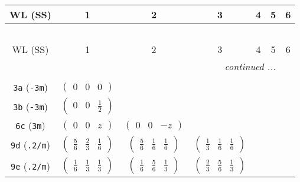 \documentclass[fleqn,9pt,landscape]{jsarticle}
\begin{document}
\begin{center}
\renewcommand{\arraystretch}{1.2}
\begin{longtable}{ccccccc}
 \hline \hline
WL (SS) & 1 & 2 & 3 & 4 & 5 & 6 \\ \hline \endfirsthead

\multicolumn{6}{l}{\tablename\ \thetable{}} \\
 \hline \hline
WL (SS) & 1 & 2 & 3 & 4 & 5 & 6 \\ \hline \endhead

 \hline \hline
\multicolumn{6}{r}{\footnotesize\it continued ...} \\ \endfoot

 \hline \hline
\multicolumn{6}{r}{} \\ \endlastfoot

{\tt 3a} ({\tt -3m}) & $ \begin{pmatrix} 0 & 0 & 0 \end{pmatrix} $ & $  $ & $  $ & $  $ & $  $ & $  $ \\ \hline
{\tt 3b} ({\tt -3m}) & $ \begin{pmatrix} 0 & 0 & \frac{1}{2} \end{pmatrix} $ & $  $ & $  $ & $  $ & $  $ & $  $ \\ \hline
{\tt 6c} ({\tt 3m}) & $ \begin{pmatrix} 0 & 0 & z \end{pmatrix} $ & $ \begin{pmatrix} 0 & 0 & - z \end{pmatrix} $ & $  $ & $  $ & $  $ & $  $ \\ \hline
{\tt 9d} ({\tt .2/m}) & $ \begin{pmatrix} \frac{5}{6} & \frac{2}{3} & \frac{1}{6} \end{pmatrix} $ & $ \begin{pmatrix} \frac{5}{6} & \frac{1}{6} & \frac{1}{6} \end{pmatrix} $ & $ \begin{pmatrix} \frac{1}{3} & \frac{1}{6} & \frac{1}{6} \end{pmatrix} $ & $  $ & $  $ & $  $ \\ \hline
{\tt 9e} ({\tt .2/m}) & $ \begin{pmatrix} \frac{1}{6} & \frac{1}{3} & \frac{1}{3} \end{pmatrix} $ & $ \begin{pmatrix} \frac{1}{6} & \frac{5}{6} & \frac{1}{3} \end{pmatrix} $ & $ \begin{pmatrix} \frac{2}{3} & \frac{5}{6} & \frac{1}{3} \end{pmatrix} $ & $  $ & $  $ & $  $ \\ \hline

\end{longtable}
\end{center}
\end{document}
